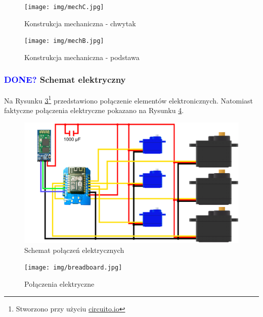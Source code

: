 \documentclass[11pt,titlepage,a4paper]{article}
\begin{document}
\begin{figure}[h!]
    \begin{center}
        \texttt{[image: img/mechC.jpg]}
    \end{center}
    \caption{Konstrukcja mechaniczna - chwytak}
    \label{mechC}
\end{figure}

\begin{figure}[h!]
    \begin{center}
        \texttt{[image: img/mechB.jpg]}
    \end{center}
    \caption{Konstrukcja mechaniczna - podstawa}
    \label{mechB}
\end{figure}

\subsubsection{\textcolor{blue}{DONE?} Schemat elektryczny}

Na Rysunku \ref{SchematElektryczny}\footnote{Stworzono przy użyciu \href{https://www.circuito.io}{\underline{circuito.io}}} przedstawiono połączenie elementów elektronicznych. Natomiast faktyczne połączenia elektryczne pokazano na Rysunku \ref{Breadboard}.

\vspace{4cm}

\begin{figure}[h!]
    \begin{center}
        \includegraphics[width=\textwidth]{img/schemat.png}
    \end{center}
    \caption{Schemat połączeń elektrycznych}
    \vspace{4cm}
    \label{SchematElektryczny}
\end{figure}

\begin{figure}[p]
    \begin{center}
        \texttt{[image: img/breadboard.jpg]}
    \end{center}
    \caption{Połączenia elektryczne}
    \label{Breadboard}
\end{figure}
\end{document}

